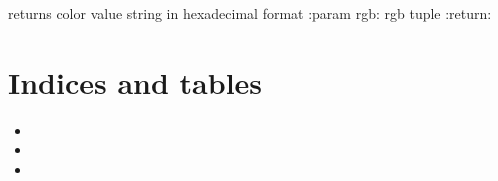 \documentclass[letterpaper,10pt,english]{sphinxmanual}
\begin{document}

\begin{fulllineitems}
\label{\detokenize{utils:utils.rgb_to_hex}}
\pysigstartsignatures
{}
\pysigstopsignatures
\sphinxAtStartPar
returns color value string in hexadecimal format
:param rgb: rgb tuple
:return:

\end{fulllineitems}



\chapter{Indices and tables}
\label{\detokenize{index:indices-and-tables}}\begin{itemize}
\item {} 
\sphinxAtStartPar
{}

\item {} 
\sphinxAtStartPar
{}

\item {} 
\sphinxAtStartPar
{}

\end{itemize}
\end{document}
